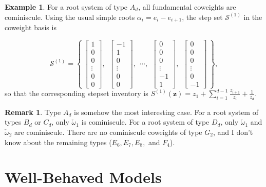\documentclass[A4,12pt]{article}
\newcommand{\<}{\left\langle}
\renewcommand{\>}{\right\rangle}
\newcommand{\coweight}{\check{\omega}}
\newcommand{\steps}{\mathcal{S}}
\newcommand{\z}{\mathbf{z}}
\theoremstyle{definition}
\theoremstyle{example}
\newtheorem{example}{Example}
\newtheorem{remark}[theorem]{Remark}
\begin{document}
\begin{example}
\label{ex:cominiscule-1}
For a root system of type $A_d$, all fundamental coweights are cominiscule. Using the usual simple roots $\alpha_i=e_i-e_{i+1}$, the step set $\steps^{(1)}$ in the coweight basis is 

$$ \steps^{(1)} = \left\{ ~
\begin{bmatrix} 1\\0\\0\\ \vdots\\0\\0 \end{bmatrix} ,~~ \begin{bmatrix} -1\\1\\0\\ \vdots \\0\\0 \end{bmatrix}
 ,~~ \cdots ,~~
\begin{bmatrix} 0\\0\\0\\ \vdots \\-1\\1 \end{bmatrix} ,~~ \begin{bmatrix} 0\\0\\0\\ \vdots \\0\\-1 \end{bmatrix}
~ \right\}, $$
so that the corresponding stepset inventory is $S^{(1)}(\z) = z_1 + \sum_{i=1}^{d-1} \frac{z_{i+1}}{z_i} + \frac{1}{z_d}$.
\end{example}

\begin{remark}
\label{ex:cominiscule-1}
Type $A_d$ is somehow the most interesting case. For a root system of types $B_d$ or $C_d$, only $\coweight_1$ is cominiscule. For a root system of type $D_d$, only $\coweight_1$ and $\coweight_2$ are cominiscule. There are no cominiscule coweights of type $G_2$, and I don't know about the remaining types ($E_6, E_7, E_8,$ and $F_4$).
\end{remark}

\section{Well-Behaved Models}
\end{document}

